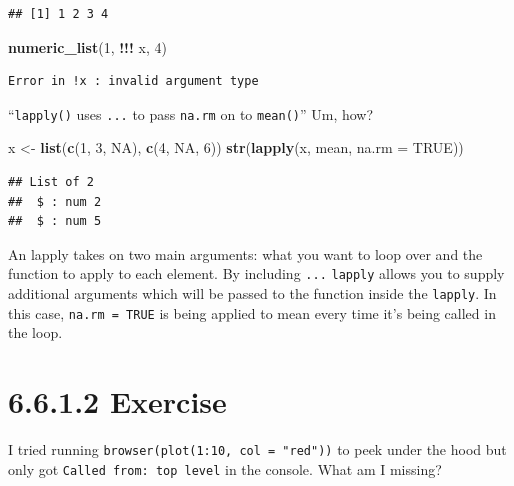 \documentclass[]{book}
\newenvironment{Shaded}{\begin{snugshade}}{\end{snugshade}}
\newcommand{\DataTypeTok}[1]{\textcolor[rgb]{0.13,0.29,0.53}{#1}}
\newcommand{\DecValTok}[1]{\textcolor[rgb]{0.00,0.00,0.81}{#1}}
\newcommand{\KeywordTok}[1]{\textcolor[rgb]{0.13,0.29,0.53}{\textbf{#1}}}
\newcommand{\NormalTok}[1]{#1}
\newcommand{\OperatorTok}[1]{\textcolor[rgb]{0.81,0.36,0.00}{\textbf{#1}}}
\newcommand{\OtherTok}[1]{\textcolor[rgb]{0.56,0.35,0.01}{#1}}
\newcommand{\StringTok}[1]{\textcolor[rgb]{0.31,0.60,0.02}{#1}}
\begin{document}
\begin{verbatim}
## [1] 1 2 3 4
\end{verbatim}

\begin{Shaded}
\begin{Highlighting}[]
\KeywordTok{numeric_list}\NormalTok{(}\DecValTok{1}\NormalTok{, }\OperatorTok{!!!}\StringTok{ }\NormalTok{x, }\DecValTok{4}\NormalTok{)}
\end{Highlighting}
\end{Shaded}

\begin{verbatim}
Error in !x : invalid argument type
\end{verbatim}

``\texttt{lapply()} uses \texttt{...} to pass \texttt{na.rm} on to \texttt{mean()}'' Um, how?

\begin{Shaded}
\begin{Highlighting}[]
\NormalTok{x <-}\StringTok{ }\KeywordTok{list}\NormalTok{(}\KeywordTok{c}\NormalTok{(}\DecValTok{1}\NormalTok{, }\DecValTok{3}\NormalTok{, }\OtherTok{NA}\NormalTok{), }\KeywordTok{c}\NormalTok{(}\DecValTok{4}\NormalTok{, }\OtherTok{NA}\NormalTok{, }\DecValTok{6}\NormalTok{))}
\KeywordTok{str}\NormalTok{(}\KeywordTok{lapply}\NormalTok{(x, mean, }\DataTypeTok{na.rm =} \OtherTok{TRUE}\NormalTok{))}
\end{Highlighting}
\end{Shaded}

\begin{verbatim}
## List of 2
##  $ : num 2
##  $ : num 5
\end{verbatim}

An lapply takes on two main arguments: what you want to loop over and the function to apply to each element. By including \texttt{...} \texttt{lapply} allows you to supply additional arguments which will be passed to the function inside the \texttt{lapply}. In this case, \texttt{na.rm\ =\ TRUE} is being applied to mean every time it's being called in the loop.

\hypertarget{exercise-4}{%
\section*{6.6.1.2 Exercise}\label{exercise-4}}

I tried running \texttt{browser(plot(1:10,\ col\ =\ "red"))} to peek under the hood but only got \texttt{Called\ from:\ top\ level} in the console. What am I missing?
\end{document}
